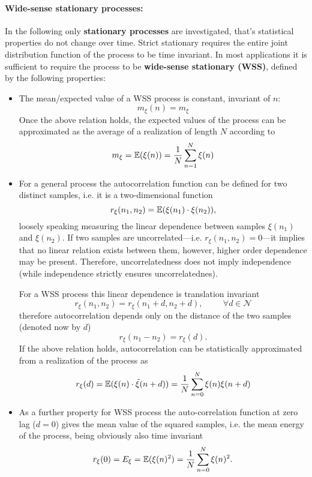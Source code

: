 \paragraph*{Wide-sense stationary processes:}
In the following only \textbf{stationary processes} are investigated, that's statistical properties do not change over time.
Strict stationary requires the entire joint distribution function of the process to be time invariant.
In most applications it is sufficient to require the process to be \textbf{wide-sense stationary (WSS)}, defined by the following properties:
\begin{itemize}
\item The mean/expected value of a WSS process is constant, invariant of $n$:
\begin{equation}
m_\xi(n) = m_\xi
\end{equation}
Once the above relation holds, the expected values of the process can be approximated as the average of a realization of length $N$ according to
\begin{equation}
m_\xi = \operatorname{\mathbb{E}}(\xi(n) ) = \frac{1}{N} \sum_{n = 1}^{N} \xi(n)
\end{equation}
\item For a general process the autocorrelation function can be defined for two distinct samples, i.e. it is a two-dimensional function 
\begin{equation}
r_\xi(n_1,n_2) = \operatorname{\mathbb{E}}( \xi(n_1) \cdot \xi(n_2) ),
\end{equation}
loosely speaking measuring the linear dependence between samples $\xi(n_1)$ and $\xi(n_2)$.
If two samples are uncorrelated---i.e. $r_\xi(n_1,n_2)=0$---it implies that no linear relation exists between them, however, higher order dependence may be present.
Therefore, uncorrelatedness does not imply independence (while independence strictly ensures uncorrelatednes).

For a WSS process this linear dependence is translation invariant
\begin{equation}
r_\xi(n_1,n_2) = r_\xi(n_1+ d , n_2 + d), \hspace{1cm} \forall d \in \mathcal{N}
\end{equation}
therefore autocorrelation depends only on the distance of the two samples (denoted now by $d$)
\begin{equation}
r_\xi(n_1 - n_2) = r_\xi(d).
\end{equation}
If the above relation holds, autocorrelation can be statistically approximated from a realization of the process as
\begin{equation}
r_\xi(d) = \operatorname{\mathbb{E}}( \xi(n) \cdot \tilde{\xi}(n + d) ) = \frac{1}{N} \sum_{n = 0}^N \xi(n) \xi(n + d)
\label{Eq:correlation_Def}
\end{equation}
\item As a further property for WSS process the auto-correlation function at zero lag ($d=0$) gives the mean value of the squared samples, i.e. the mean energy of the process, being obviously also time invariant
\begin{equation}
r_\xi(0) = E_\xi =  \operatorname{\mathbb{E}}( \xi(n)^2 ) = \frac{1}{N} \sum_{n = 0}^N \xi(n)^2.
\end{equation}
\end{itemize}

